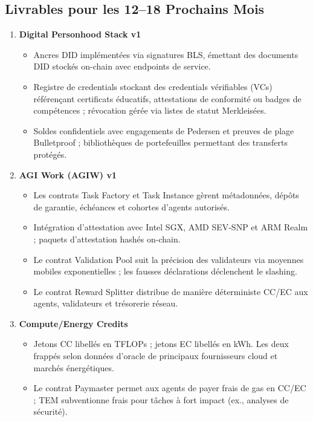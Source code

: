 \documentclass[11pt]{article}
\begin{document}
\subsection{Livrables pour les 12--18 Prochains Mois}
\begin{enumerate}[label=\textbf{D\arabic*.}, leftmargin=*]
  \item \textbf{Digital Personhood Stack v1}
  \begin{itemize}[noitemsep]
    \item Ancres DID implémentées via signatures BLS, émettant des documents DID stockés on-chain avec endpoints de service.
    \item Registre de credentials stockant des credentials vérifiables (VCs) référençant certificats éducatifs, attestations de conformité ou badges de compétences ; révocation gérée via listes de statut Merkleisées.
    \item Soldes confidentiels avec engagements de Pedersen et preuves de plage Bulletproof ; bibliothèques de portefeuilles permettant des transferts protégés.
  \end{itemize}
  \item \textbf{AGI Work (AGIW) v1}
  \begin{itemize}[noitemsep]
    \item Les contrats Task Factory et Task Instance gèrent métadonnées, dépôts de garantie, échéances et cohortes d'agents autorisés.
    \item Intégration d'attestation avec Intel SGX, AMD SEV-SNP et ARM Realm ; paquets d'attestation hashés on-chain.
    \item Le contrat Validation Pool suit la précision des validateurs via moyennes mobiles exponentielles ; les fausses déclarations déclenchent le slashing.
    \item Le contrat Reward Splitter distribue de manière déterministe CC/EC aux agents, validateurs et trésorerie réseau.
  \end{itemize}
  \item \textbf{Compute/Energy Credits}
  \begin{itemize}[noitemsep]
    \item Jetons CC libellés en TFLOPs ; jetons EC libellés en kWh. Les deux frappés selon données d'oracle de principaux fournisseurs cloud et marchés énergétiques.
    \item Le contrat Paymaster permet aux agents de payer frais de gas en CC/EC ; TEM subventionne frais pour tâches à fort impact (ex., analyses de sécurité).
  \end{itemize}

\end{enumerate}
\end{document}
